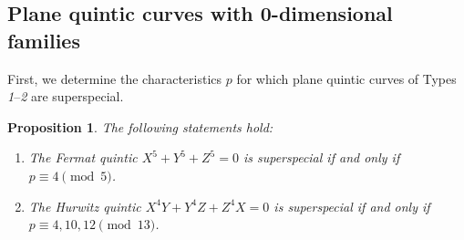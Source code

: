 \documentclass[10pt,a4paper]{amsart}
\newtheorem{Prop}[Def]{Proposition}
\begin{document}
\subsection{Plane quintic curves with 0-dimensional families}\label{subsec:type1-5}\vspace{0.5mm}
First, we determine the characteristics $p$ for which plane quintic curves of Types \hspace{-0.2mm}\textit{1}--\textit{2} are superspecial.\vspace{-1mm}
\begin{Prop}\label{prop:type1-2}
The following statements hold:\vspace{-0.6mm}
\begin{enumerate}
\item[(1)] The Fermat quintic $X^5+Y^5+Z^5 = 0$ is superspecial if and only if $p \equiv 4 \pmod{5}$.\vspace{-2.6mm}
\item[(2)] The Hurwitz quintic $X^4Y+Y^4Z+Z^4X = 0$ is superspecial if and only if $p \equiv 4,10,12 \pmod{13}$.\vspace{0.3mm}
\end{enumerate}
\end{Prop}
\end{document}
